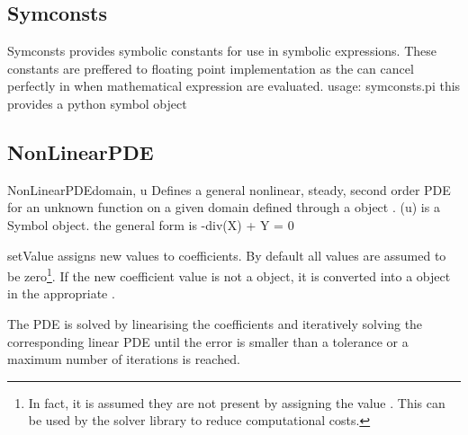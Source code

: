 \subsection{Symconsts}
Symconsts provides symbolic constants for use in symbolic expressions. These constants are preffered to floating point implementation as the can cancel perfectly in when mathematical expression are evaluated.
usage:
	symconsts.pi this provides a python symbol object


\subsection{NonLinearPDE}
\begin{classdesc}{NonLinearPDE}{domain, u}
Defines a general nonlinear, steady, second order PDE for an unknown function  on a given domain defined through a \Domain object . \var(u) is a Symbol object.
the general form is -div(X) + Y = 0 
\end{classdesc}


\begin{methoddesc}[NonLinearPDE]{setValue}{
}
assigns new values to coefficients. By default all values are assumed to be
zero\footnote{In fact, it is assumed they are not present by assigning the
value . This can be used by the solver library to reduce
computational costs.}.
If the new coefficient value is not a \Data object, it is converted into a
\Data object in the appropriate \FunctionSpace.
\end{methoddesc}

The PDE is solved by linearising the coefficients and iteratively solving
the corresponding linear PDE until the error is smaller than a tolerance
or a maximum number of iterations is reached.   
